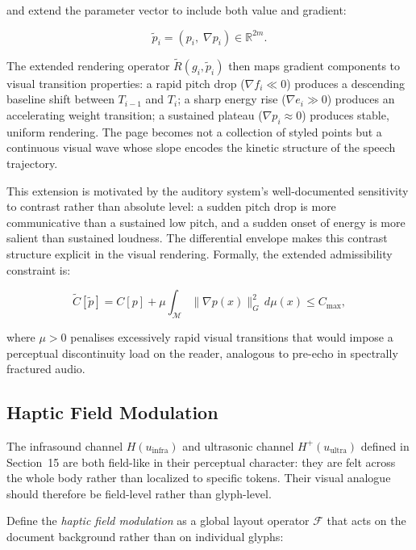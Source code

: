 \documentclass[12pt, a4paper]{article}
\begin{document}
and extend the parameter vector to include both value and gradient:

\begin{equation}
\tilde{p}_i = (p_i,\; \nabla p_i) \in \mathbb{R}^{2m}.
\label{eq:ptilde}
\end{equation}

The extended rendering operator $\tilde{R}(g_i, \tilde{p}_i)$ then maps gradient components to visual transition properties: a rapid pitch drop ($\nabla f_i \ll 0$) produces a descending baseline shift between $T_{i-1}$ and $T_i$; a sharp energy rise ($\nabla e_i \gg 0$) produces an accelerating weight transition; a sustained plateau ($\nabla p_i \approx 0$) produces stable, uniform rendering. The page becomes not a collection of styled points but a continuous visual wave whose slope encodes the kinetic structure of the speech trajectory.

This extension is motivated by the auditory system's well-documented sensitivity to contrast rather than absolute level: a sudden pitch drop is more communicative than a sustained low pitch, and a sudden onset of energy is more salient than sustained loudness. The differential envelope makes this contrast structure explicit in the visual rendering. Formally, the extended admissibility constraint is:

\begin{equation}
\tilde{C}[\tilde{p}] = C[p] + \mu \int_{\mathcal{M}} \|\nabla p(x)\|_G^2\, d\mu(x) \leq C_{\max},
\label{eq:Ctilde}
\end{equation}

where $\mu > 0$ penalises excessively rapid visual transitions that would impose a perceptual discontinuity load on the reader, analogous to pre-echo in spectrally fractured audio.

\subsection{Haptic Field Modulation}

The infrasound channel $H(u_{\mathrm{infra}})$ and ultrasonic channel $H^+(u_{\mathrm{ultra}})$ defined in Section~15 are both field-like in their perceptual character: they are felt across the whole body rather than localized to specific tokens. Their visual analogue should therefore be field-level rather than glyph-level.

Define the \emph{haptic field modulation} as a global layout operator $\mathcal{F}$ that acts on the document background rather than on individual glyphs:
\end{document}

